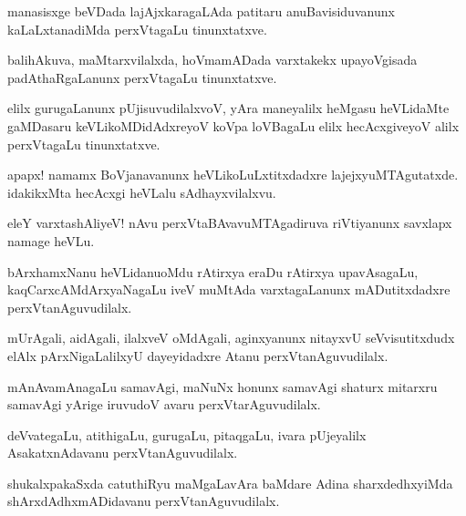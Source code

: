 \begin{mng}
manasisxge beVDada lajAjxkaragaLAda patitaru anuBavisiduvanunx kaLaLxtanadiMda perxVtagaLu tinunxtatxve.
\end{mng}

\begin{mng}
balihAkuva, maMtarxvilalxda, hoVmamADada varxtakekx upayoVgisada padAthaRgaLanunx perxVtagaLu tinunxtatxve.
\end{mng}

\begin{mng}
elilx gurugaLanunx pUjisuvudilalxvoV, yAra maneyalilx heMgasu heVLidaMte gaMDasaru keVLikoMDidAdxreyoV koVpa loVBagaLu elilx hecAcxgiveyoV alilx perxVtagaLu tinunxtatxve.
\end{mng}

\begin{mng}
apapx! namamx BoVjanavanunx heVLikoLuLxtitxdadxre lajejxyuMTAgutatxde. idakikxMta hecAcxgi heVLalu sAdhayxvilalxvu.
\end{mng}

\begin{mng}
eleY varxtashAliyeV! nAvu perxVtaBAvavuMTAgadiruva riVtiyanunx savxlapx namage heVLu.
\end{mng}

\begin{mng}
bArxhamxNanu heVLidanu\mdash oMdu rAtirxya eraDu rAtirxya upavAsagaLu, kaqCarxcAMdArxyaNagaLu iveV muMtAda varxtagaLanunx mADutitxdadxre perxVtanAguvudilalx.
\end{mng}

\begin{mng}
mUrAgali, aidAgali, ilalxveV oMdAgali, aginxyanunx nitayxvU seVvisutitxdudx elAlx pArxNigaLalilxyU dayeyidadxre Atanu perxVtanAguvudilalx.
\end{mng}

\begin{mng}
mAnAvamAnagaLu samavAgi, maNuNx honunx samavAgi shaturx mitarxru samavAgi yArige iruvudoV avaru perxVtarAguvudilalx.
\end{mng}

\begin{mng}
deVvategaLu, atithigaLu, gurugaLu, pitaqgaLu, ivara pUjeyalilx AsakatxnAdavanu perxVtanAguvudilalx.
\end{mng}

\begin{mng}
shukalxpakaSxda catuthiRyu maMgaLavAra baMdare Adina sharxdedhxyiMda shArxdAdhxmADidavanu perxVtanAguvudilalx.
\end{mng}

